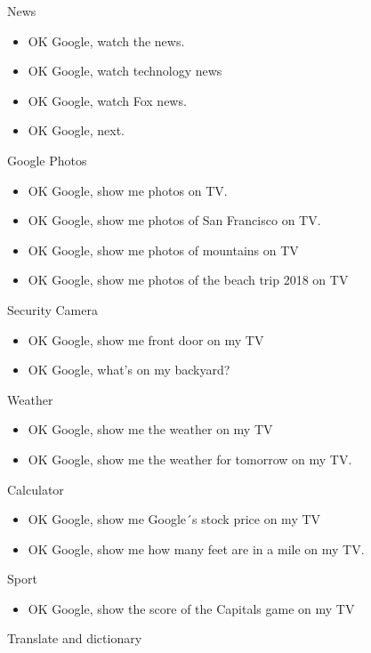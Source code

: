 \documentclass[
  a4paper,
]{article}
\providecommand{\tightlist}{%
  \setlength{\itemsep}{0pt}\setlength{\parskip}{0pt}}\usepackage{longtable,booktabs,array}
\begin{document}
News

\begin{itemize}
\item
  OK Google, watch the news.
\item
  OK Google, watch technology news
\item
  OK Google, watch Fox news.
\item
  OK Google, next.
\end{itemize}

Google Photos

\begin{itemize}
\item
  OK Google, show me photos on TV.
\item
  OK Google, show me photos of San Francisco on TV.
\item
  OK Google, show me photos of mountains on TV
\item
  OK Google, show me photos of the beach trip 2018 on TV
\end{itemize}

Security Camera

\begin{itemize}
\item
  OK Google, show me front door on my TV
\item
  OK Google, what's on my backyard?
\end{itemize}

Weather~~

\begin{itemize}
\item
  OK Google, show me the weather on my TV
\item
  OK Google, show me the weather for tomorrow on my TV.
\end{itemize}

Calculator~~

\begin{itemize}
\item
  OK Google, show me Google´s stock price on my TV
\item
  OK Google, show me how many feet are in a mile on my TV.
\end{itemize}

Sport

\begin{itemize}
\tightlist
\item
  OK Google, show the score of the Capitals game on my TV
\end{itemize}

Translate and dictionary
\end{document}

